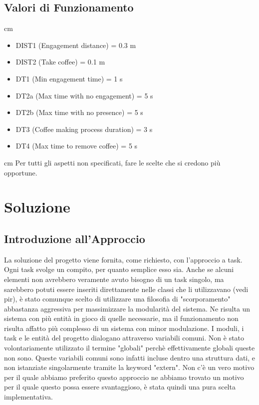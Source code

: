\documentclass{article}
\begin{document}
\subsection{Valori di Funzionamento}
 cm
\begin{itemize}
	\item DIST1 (Engagement distance) = 0.3 m
	\item DIST2 (Take coffee) = 0.1 m
	\item DT1 (Min engagement time) = 1 s
	\item DT2a (Max time with no engagement) = 5 s
	\item DT2b (Max time with no presence) = 5 s
	\item DT3 (Coffee making process duration) = 3 s
	\item DT4 (Max time to remove coffee) = 5 s
\end{itemize}
 cm
Per tutti gli aspetti non specificati, fare le scelte che si credono più opportune.
\newpage


\section{Soluzione}

\subsection{Introduzione all'Approccio}
La soluzione del progetto viene fornita, come richiesto, con l'approccio a task. Ogni task svolge un compito, per quanto semplice esso sia. Anche se alcuni elementi non avrebbero veramente avuto bisogno di un task singolo, ma sarebbero potuti essere inseriti direttamente nelle classi che li utilizzavano (vedi pir), è stato comunque scelto di utilizzare una filosofia di "scorporamento" abbastanza aggressiva per massimizzare la modularità del sistema. Ne risulta un sistema con più entità in gioco di quelle necessarie, ma il funzionamento non risulta affatto più complesso di un sistema con minor modulazione. \newline
I moduli, i task e le entità del progetto dialogano attraverso variabili comuni. Non è stato volontariamente utilizzato il termine "globali" perchè effettivamente globali queste non sono. Queste variabili comuni sono infatti incluse dentro una struttura dati, e non istanziate singolarmente tramite la keyword "extern". Non c'è un vero motivo per il quale abbiamo preferito questo approccio ne abbiamo trovato un motivo per il quale questo possa essere svantaggioso, è stata quindi una pura scelta implementativa.
\end{document}
